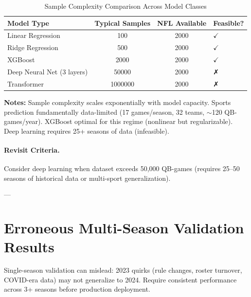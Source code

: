 \begin{table}[htbp]
\centering
\small
\caption{Sample Complexity Comparison Across Model Classes}
\label{tab:sample-complexity}
\begin{tabular}{@{}lS[table-format=6.0]S[table-format=4.0]l@{}}
\toprule
\textbf{Model Type} & {\textbf{Typical Samples}} & {\textbf{NFL Available}} & \textbf{Feasible?} \\
\midrule
Linear Regression & 100 & 2000 & $\checkmark$ \\
Ridge Regression & 500 & 2000 & $\checkmark$ \\
XGBoost & 2000 & 2000 & $\checkmark$ \\
Deep Neural Net (3 layers) & 50000 & 2000 & ✗ \\
Transformer & 1000000 & 2000 & ✗ \\
\bottomrule
\end{tabular}
\begin{tablenotes}
\item \textbf{Notes:} Sample complexity scales exponentially with model capacity. Sports prediction fundamentally data-limited (17 games/season, 32 teams, $\sim$120 QB-games/year). XGBoost optimal for this regime (nonlinear but regularizable). Deep learning requires 25+ seasons of data (infeasible).
\end{tablenotes}
\end{table}

\paragraph{Revisit Criteria.}
Consider deep learning when dataset exceeds 50,000 QB-games (requires 25--50 seasons of historical data or multi-sport generalization).

---

\section{Erroneous Multi-Season Validation Results}
\label{sec:multiseas-validation}

Single-season validation can mislead: 2023 quirks (rule changes, roster turnover, COVID-era data) may not generalize to 2024. Require consistent performance across 3+ seasons before production deployment.

